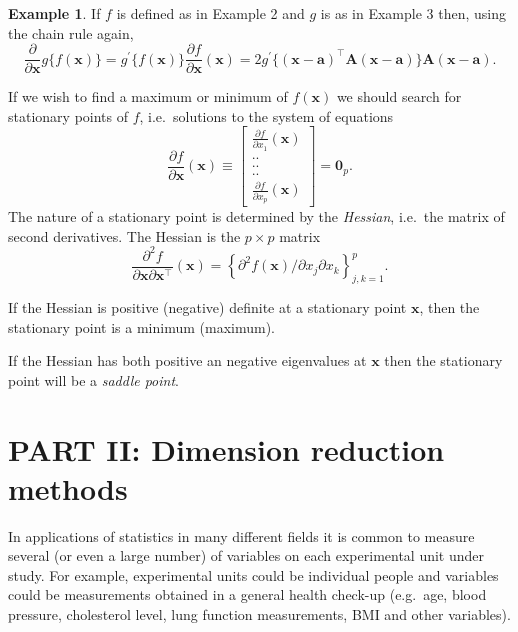 \documentclass[]{book}
\theoremstyle{definition}
\theoremstyle{definition}
\newtheorem{example}{Example}[chapter]
\theoremstyle{definition}
\theoremstyle{remark}
\begin{document}
\begin{example}
\protect\hypertarget{exm:unnamed-chunk-16}{}{\label{exm:unnamed-chunk-16} }If \(f\) is defined as in Example 2 and \(g\) is as in Example 3 then, using the chain rule again,
\[
\frac{\partial }{\partial \boldsymbol x} g\{f(\boldsymbol x)\}=g^{\prime} \{f(\boldsymbol x)\}\frac{\partial f}{\partial \boldsymbol x}(\boldsymbol x)
=2 g^{\prime}\{(\boldsymbol x- \boldsymbol a)^\top \boldsymbol A(\boldsymbol x- \boldsymbol a)\}\boldsymbol A(\boldsymbol x-\boldsymbol a).
\]
\end{example}

If we wish to find a maximum or minimum of \(f(\boldsymbol x)\) we should search for stationary points of \(f\),
i.e.~solutions to the system of equations
\[
\frac{\partial f}{\partial \boldsymbol x}(\boldsymbol x)\equiv \left [ \begin{array}{c} \frac{\partial f}{\partial x_1}(\boldsymbol x)\\
 ..\\
 ..\\
 ..\\
 \frac{\partial f}{\partial x_p}(\boldsymbol x)
\end{array} \right ]={\mathbf 0}_p.
\]
The nature of a stationary point is determined by the \emph{Hessian}, i.e.~the matrix of second derivatives.
The Hessian is the \(p \times p\) matrix
\[
\frac{\partial^2f}{\partial \boldsymbol x\partial \boldsymbol x^\top}(\boldsymbol x) =\left \{ \partial^2 f(\boldsymbol x)/\partial x_j \partial x_k\right \}_{j,k=1}^p.
\]

If the Hessian is positive (negative) definite at a stationary point \(\boldsymbol x\), then the stationary point is a minimum (maximum).

If the Hessian has both positive an negative eigenvalues at \(\boldsymbol x\) then the stationary point will be a \emph{saddle point}.

\hypertarget{part-ii-dimension-reduction-methods}{%
\chapter*{PART II: Dimension reduction methods}\label{part-ii-dimension-reduction-methods}}

In applications of statistics in many different fields it is common to measure several (or even a large number) of variables on each experimental unit under study. For example, experimental units could be individual people and variables could be measurements obtained in a general health check-up (e.g.~age, blood pressure, cholesterol level, lung function measurements, BMI and other variables).
\end{document}
